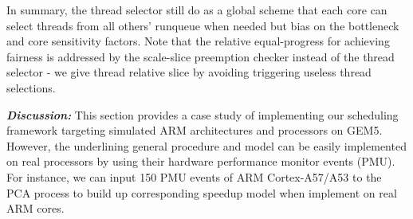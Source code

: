 \documentclass[sigplan,review,anonymous]{acmart}\settopmatter{printfolios=true,printccs=false,printacmref=false}
\begin{document}
In summary, the thread selector still do as a global scheme that each core can select threads from all others' runqueue when needed but bias on the bottleneck and core sensitivity factors. 
Note that the relative equal-progress for achieving fairness is addressed by the scale-slice preemption checker instead of the thread selector - we give thread relative slice by avoiding triggering useless thread selections.

\textbf{\textit{Discussion:}}
This section provides a case study of implementing our scheduling framework targeting simulated ARM architectures and processors on GEM5.  However, the underlining general procedure and model can be easily implemented on real processors by using their hardware performance monitor events (PMU). For instance, we can input 150 PMU events \cite{ARMA57} of ARM Cortex-A57/A53 to the PCA process to build up corresponding speedup model when implement on real ARM cores.
\end{document}
